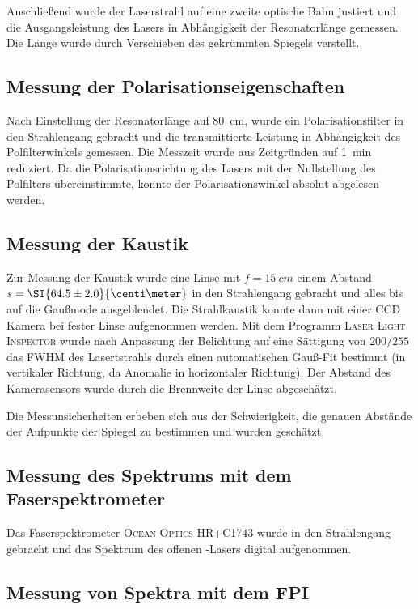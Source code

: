 \documentclass[slug=GL, room=HZDR\ Dresden/Rossendorf\,\ Geb.\ 620/123, supervisor=Tim\ Ziegler]{../../Lab_Report_LaTeX/lab_report}
\newcommand{\hne}{\ce{HeNe}-Laser}
\begin{document}
Anschlie\ss{}end wurde der Laserstrahl auf eine zweite optische Bahn
justiert und die Ausgangsleistung des Lasers in Abh\"angigkeit der
Resonatorl\"ange gemessen. Die L\"ange wurde durch Verschieben des
gekr\"ummten Spiegels verstellt.

\subsection{Messung der Polarisationseigenschaften}
\label{sec:poleig}

Nach Einstellung der Resonatorl\"ange auf \SI{80}{\centi\meter}, wurde
ein Polarisationsfilter in den Strahlengang gebracht und die
transmittierte Leistung in Abh\"angigkeit des Polfilterwinkels
gemessen.
Die Messzeit wurde aus Zeitgr\"unden auf \SI{1}{\minute} reduziert.
Da die Polarisationsrichtung des Lasers mit der Nullstellung des
Polfilters \"ubereinstimmte, konnte der Polarisationswinkel absolut
abgelesen werden.

\subsection{Messung der Kaustik}
\label{sec:messkaus}

Zur Messung der Kaustik wurde eine Linse mit \(f=\SI{15}{cm}\)
einem Abstand \(s=\SI{64.5\pm 2.0}{\centi\meter}\) in den Strahlengang
gebracht und alles bis auf die Gau\ss{}mode ausgeblendet. Die
Strahlkaustik konnte dann mit einer CCD Kamera bei fester Linse
aufgenommen werden. Mit dem Programm \textsc{Laser Light Inspector}
wurde nach Anpassung der Belichtung auf eine S\"attigung von
\(200/255\) das FWHM des Lasertstrahls durch einen automatischen
Gauß-Fit bestimmt (in vertikaler Richtung, da Anomalie in
horizontaler Richtung). Der Abstand des Kamerasensors wurde durch die
Brennweite der Linse abgesch\"atzt.

Die Messunsicherheiten erbeben sich aus der Schwierigkeit, die genauen
Abst\"ande der Aufpunkte der Spiegel zu bestimmen und wurden
gesch\"atzt.

\subsection{Messung des Spektrums mit dem Faserspektrometer}
\label{sec:faser}

Das Faserspektrometer \textsc{Ocean Optics HR+C1743} wurde in den
Strahlengang gebracht und das Spektrum des offenen \hne{}s digital aufgenommen.

\subsection{Messung von Spektra mit dem FPI}
\label{sec:kalibzeit}
\end{document}
